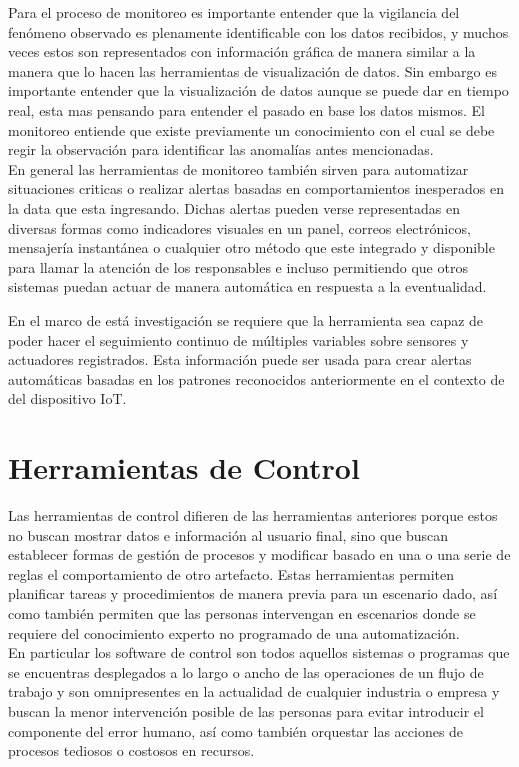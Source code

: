Para el proceso de monitoreo es importante entender que la vigilancia del fenómeno observado es plenamente identificable con los datos recibidos, y muchos veces estos son representados con información gráfica de manera similar a la manera que lo hacen las herramientas de visualización de datos. Sin embargo es importante entender que la visualización de datos aunque se puede dar en tiempo real, esta mas pensando para entender el pasado en base los datos mismos. El monitoreo entiende que existe previamente un conocimiento con el cual se debe regir la observación para identificar las anomalías antes mencionadas.\\

En general las herramientas de monitoreo también sirven para automatizar situaciones criticas o realizar alertas basadas en comportamientos inesperados en la data que esta ingresando. Dichas alertas pueden verse representadas en diversas formas como indicadores visuales en un panel, correos electrónicos, mensajería instantánea o cualquier otro método que este integrado y disponible para llamar la atención de los responsables e incluso permitiendo que otros sistemas puedan actuar de manera automática en respuesta a la eventualidad. 

En el marco de está investigación se requiere que la herramienta sea capaz de poder hacer el seguimiento continuo de múltiples variables sobre sensores y actuadores registrados. Esta información puede ser usada para crear alertas automáticas basadas en los patrones reconocidos anteriormente en el contexto de del dispositivo IoT. 


\section{Herramientas de Control}
Las herramientas de control difieren de las herramientas anteriores porque estos no buscan mostrar datos e información al usuario final, sino que buscan establecer formas de gestión de procesos y modificar basado en una o una serie de reglas el comportamiento de otro artefacto. Estas herramientas permiten planificar tareas y procedimientos de manera previa para un escenario dado, así como también permiten que las personas intervengan en escenarios donde se requiere del conocimiento experto no programado de una automatización.\\

En particular los software de control son todos aquellos sistemas o programas que se encuentras desplegados a lo largo o ancho de las operaciones de un flujo de trabajo y son omnipresentes en la actualidad de cualquier industria o empresa y buscan la menor intervención posible de las personas para evitar introducir el componente del error humano, así como también orquestar las acciones de procesos tediosos o costosos en recursos.\\

